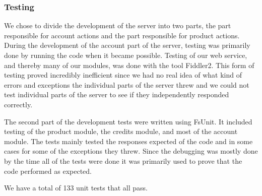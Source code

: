 \subsubsection{Testing}
We chose to divide the development of the server into two parts, the part responsible for account actions and the part responsible for product actions.  During the development of the account part of the server, testing was primarily done by running the code when it became possible. Testing of our web service, and thereby many of our modules, was done with the tool Fiddler2. This form of testing proved incredibly inefficient since we had no real idea of what kind of errors and exceptions the individual parts of the server threw and we could not test individual parts of the server to see if they independently responded correctly.

The second part of the development tests were written using FsUnit. It included testing of the product module, the credits module, and most of the account module. The tests mainly tested the responses expected of the code and in some cases for some of the exceptions they threw. Since the debugging was mostly done by the time all of the tests were done it was primarily used to prove that the code performed as expected.

We have a total of 133 unit tests that all pass.